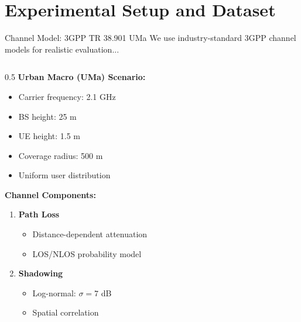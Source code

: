 \documentclass[aspectratio=169]{beamer}
\begin{document}
\section{Experimental Setup and Dataset}
\begin{frame}{Channel Model: 3GPP TR 38.901 UMa}
    \vspace{-0.2cm}
    \small \textcolor{iiitblue}{We use industry-standard 3GPP channel models for realistic evaluation...}
    
    \begin{columns}
        \begin{column}{0.5\textwidth}
            \textbf{Urban Macro (UMa) Scenario:}
            \begin{itemize}
                \item Carrier frequency: 2.1 GHz
                \item BS height: 25 m
                \item UE height: 1.5 m
                \item Coverage radius: 500 m
                \item Uniform user distribution
            \end{itemize}
            
            \vspace{0.3cm}
            
            \textbf{Channel Components:}
            \begin{enumerate}
                \item \textbf{Path Loss}
                \begin{itemize}
                    \item Distance-dependent attenuation
                    \item LOS/NLOS probability model
                \end{itemize}
                
                \item \textbf{Shadowing}
                \begin{itemize}
                    \item Log-normal: $\sigma = 7$ dB
                    \item Spatial correlation
                \end{itemize}
                

\end{enumerate}
\end{column}
\end{columns}
\end{frame}
\end{document}
